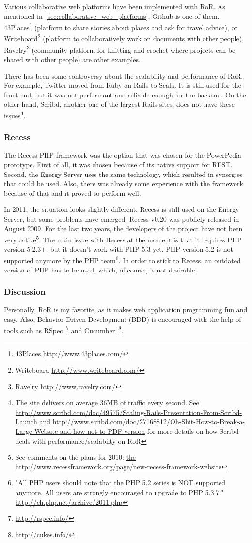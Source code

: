 Various collaborative web platforms have been implemented with RoR. As mentioned in~\ref{sec:collaborative_web_platforms}, Github is one of them. 43Places\footnote{43Places \url{http://www.43places.com/}} (platform to share stories about places and ask for travel advice), or Writeboard\footnote{Writeboard \url{http://www.writeboard.com/}} (platform to collaboratively work on documents with other people), Ravelry\footnote{Ravelry \url{http://www.ravelry.com/}} (community platform for knitting and crochet where projects can be shared with other people) are other examples.

There has been some controversy about the scalability and performance of RoR. For example, Twitter moved from Ruby on Rails to Scala. It is still used for the front-end, but it was not performant and reliable enough for the backend\cite{twitter_ruby_scala}. On the other hand, Scribd, another one of the largest Rails sites, does not have these issues\footnote{The site delivers on average 36MB of traffic every second. See \url{http://www.scribd.com/doc/49575/Scaling-Rails-Presentation-From-Scribd-Launch} and \url{http://www.scribd.com/doc/27168812/Oh-Shit-How-to-Break-a-Large-Website-and-how-not-to-PDF-version} for more details on how Scribd deals with performance/scalabilty on RoR}.

\subsubsection{Recess}
The Recess PHP framework was the option that was chosen for the PowerPedia prototype. First of all, it was chosen because of its native support for REST. Second, the Energy Server uses the same technology, which resulted in synergies that could be used. Also, there was already some experience with the framework because of that and it proved to perform well.

In 2011, the situation looks slightly different. Recess is still used on the Energy Server, but some problems have emerged. Recess v0.20 was publicly released in August 2009. For the last two years, the developers of the project have not been very active\footnote{See comments on the plans for 2010: \url{the http://www.recessframework.org/page/new-recess-framework-website}}. The main issue with Recess at the moment is that it requires PHP version 5.2.3+, but it doesn't work with PHP 5.3 yet. PHP version 5.2 is not supported anymore by the PHP team\footnote{"All PHP users should note that the PHP 5.2 series is NOT supported anymore. All users are strongly encouraged to upgrade to PHP 5.3.7." \url{http://ch.php.net/archive/2011.php}}. In order to stick to Recess, an outdated version of PHP has to be used, which, of course, is not desirable.   

\subsubsection{Discussion}
Personally, RoR is my favorite, as it makes web application programming fun and easy. Also, Behavior Driven Development (BDD) is encouraged  with the help of tools such as RSpec~\footnote{\url{http://rspec.info/}} and Cucumber~\footnote{\url{http://cukes.info/}}.


